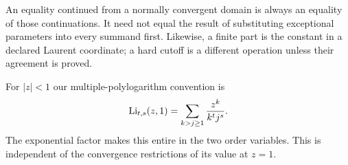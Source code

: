 An equality continued from a normally convergent domain is always an
equality of those continuations. It need not equal the result of
substituting exceptional parameters into every summand first.
Likewise, a finite part is the constant in a declared Laurent
coordinate; a hard cutoff is a different operation unless their
agreement is proved.

For $|z|<1$ our multiple-polylogarithm convention is
\begin{equation}\label{eq:mpl-convention}
 \operatorname{Li}_{t,s}(z,1)=\sum_{k>j\ge1}\frac{z^k}{k^t j^s}.
\end{equation}
The exponential factor makes this entire in the two order variables.
This is independent of the convergence restrictions of its value at
$z=1$.
